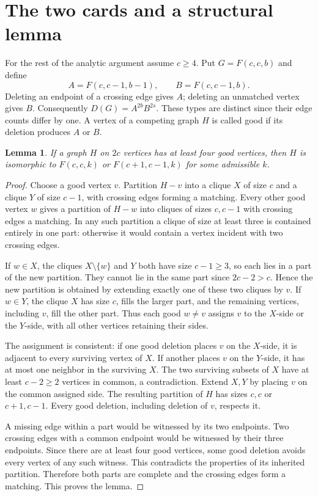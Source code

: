 \documentclass[11pt]{article}
\newtheorem{lemma}[theorem]{Lemma}
\begin{document}
\section{The two cards and a structural lemma}
For the rest of the analytic argument assume $c\geq4$. Put $G=F(c,c,b)$ and define
\[
 A=F(c,c-1,b-1),\qquad B=F(c,c-1,b).
\]
Deleting an endpoint of a crossing edge gives $A$; deleting an unmatched vertex gives $B$. Consequently $D(G)=A^{2b}B^{2s}$. These types are distinct since their edge counts differ by one. A vertex of a competing graph $H$ is called good if its deletion produces $A$ or $B$.
\begin{lemma}\label{lem:structure}
If a graph $H$ on $2c$ vertices has at least four good vertices, then $H$ is isomorphic to $F(c,c,k)$ or $F(c+1,c-1,k)$ for some admissible $k$.
\end{lemma}
\begin{proof}
Choose a good vertex $v$. Partition $H-v$ into a clique $X$ of size $c$ and a clique $Y$ of size $c-1$, with crossing edges forming a matching. Every other good vertex $w$ gives a partition of $H-w$ into cliques of sizes $c,c-1$ with crossing edges a matching. In any such partition a clique of size at least three is contained entirely in one part: otherwise it would contain a vertex incident with two crossing edges.

If $w\in X$, the cliques $X\setminus\{w\}$ and $Y$ both have size $c-1\geq3$, so each lies in a part of the new partition. They cannot lie in the same part since $2c-2>c$. Hence the new partition is obtained by extending exactly one of these two cliques by $v$. If $w\in Y$, the clique $X$ has size $c$, fills the larger part, and the remaining vertices, including $v$, fill the other part. Thus each good $w\ne v$ assigns $v$ to the $X$-side or the $Y$-side, with all other vertices retaining their sides.

The assignment is consistent: if one good deletion places $v$ on the $X$-side, it is adjacent to every surviving vertex of $X$. If another places $v$ on the $Y$-side, it has at most one neighbor in the surviving $X$. The two surviving subsets of $X$ have at least $c-2\geq2$ vertices in common, a contradiction. Extend $X,Y$ by placing $v$ on the common assigned side. The resulting partition of $H$ has sizes $c,c$ or $c+1,c-1$. Every good deletion, including deletion of $v$, respects it.

A missing edge within a part would be witnessed by its two endpoints. Two crossing edges with a common endpoint would be witnessed by their three endpoints. Since there are at least four good vertices, some good deletion avoids every vertex of any such witness. This contradicts the properties of its inherited partition. Therefore both parts are complete and the crossing edges form a matching. This proves the lemma.
\end{proof}
\end{document}
